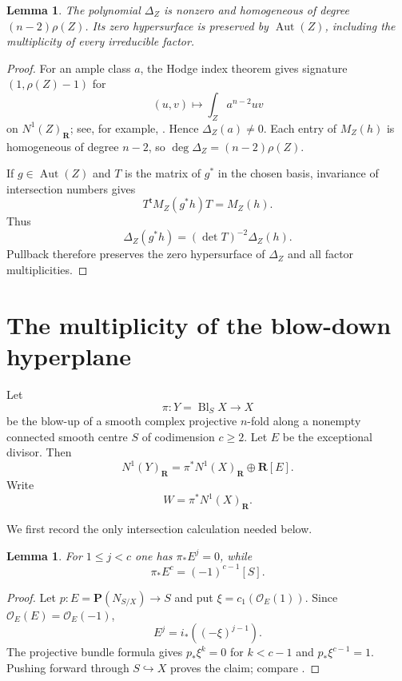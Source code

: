 \documentclass[11pt,reqno]{amsart}
\newcommand{\R}{\mathbf R}
\newcommand{\PP}{\mathbf P}
\newcommand{\OO}{\mathcal O}
\DeclareMathOperator{\Aut}{Aut}
\DeclareMathOperator{\Bl}{Bl}
\newtheorem{lemma}[theorem]{Lemma}
\theoremstyle{remark}
\begin{document}
\begin{lemma}\label{lem:discriminant}
The polynomial $\Delta_Z$ is nonzero and homogeneous of degree $(n-2)\rho(Z)$.  Its zero hypersurface is preserved by $\Aut(Z)$, including the multiplicity of every irreducible factor.
\end{lemma}

\begin{proof}
For an ample class $a$, the Hodge index theorem gives signature $(1,\rho(Z)-1)$ for
\[
 (u,v)\longmapsto\int_Z a^{n-2}uv
\]
on $N^1(Z)_{\R}$; see, for example, \cite[Theorem~7.3.4]{deCataldo2005}.  Hence $\Delta_Z(a)\ne0$.  Each entry of $M_Z(h)$ is homogeneous of degree $n-2$, so $\deg\Delta_Z=(n-2)\rho(Z)$.

If $g\in\Aut(Z)$ and $T$ is the matrix of $g^*$ in the chosen basis, invariance of intersection numbers gives
\[
 T^{\mathsf t}M_Z(g^*h)T=M_Z(h).
\]
Thus
\[
 \Delta_Z(g^*h)=(\det T)^{-2}\Delta_Z(h).
\]
Pullback therefore preserves the zero hypersurface of $\Delta_Z$ and all factor multiplicities.
\end{proof}

\section{The multiplicity of the blow-down hyperplane}

Let
\[
 \pi\colon Y=\Bl_SX\longrightarrow X
\]
be the blow-up of a smooth complex projective $n$-fold along a nonempty connected smooth centre $S$ of codimension $c\ge2$.  Let $E$ be the exceptional divisor.  Then
\begin{equation}\label{eq:NS-decomp}
 N^1(Y)_{\R}=\pi^*N^1(X)_{\R}\oplus\R[E].
\end{equation}
Write
\[
 W=\pi^*N^1(X)_{\R}.
\]

We first record the only intersection calculation needed below.

\begin{lemma}\label{lem:push-E}
For $1\le j<c$ one has $\pi_*E^j=0$, while
\[
 \pi_*E^c=(-1)^{c-1}[S].
\]
\end{lemma}

\begin{proof}
Let $p\colon E=\PP(N_{S/X})\to S$ and put $\xi=c_1(\OO_E(1))$.  Since $\OO_E(E)=\OO_E(-1)$,
\[
 E^j=i_*((-\xi)^{j-1}).
\]
The projective bundle formula gives $p_*\xi^k=0$ for $k<c-1$ and $p_*\xi^{c-1}=1$.  Pushing forward through $S\hookrightarrow X$ proves the claim; compare \cite[Chapter~3]{Fulton1998}.
\end{proof}
\end{document}

